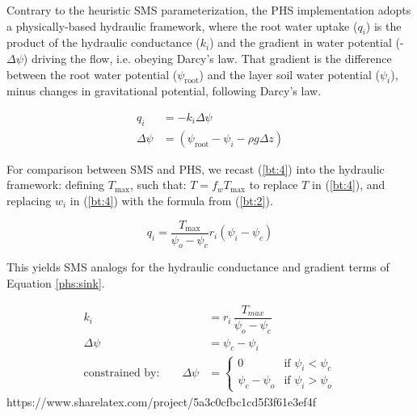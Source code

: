\documentclass[draft,linenumbers]{agujournal}
\begin{document}
    Contrary to the heuristic SMS parameterization, the PHS implementation adopts a physically-based hydraulic framework, where the root water uptake ($q_i$) is the product of the hydraulic conductance ($k_i$) and the gradient in water potential (-$\Delta\psi$) driving the flow, i.e. obeying Darcy's law. That gradient is the difference between the root water potential ($\psi_{\text{root}}$) and the layer soil water potential ($\psi_i$), minus changes in gravitational potential, following Darcy's law.
    
    \begin{linenomath*}
    \begin{equation}
        \begin{aligned}
    q_i &= -k_i \Delta\psi \\
    \Delta\psi &= \left(\psi_{\text{root}}-\psi_{i}-\rho g \Delta z\right)
    \label{phs:sink}
    \end{aligned}
    \end{equation}
    \end{linenomath*}
    
    For comparison between SMS and PHS, we recast (\ref{bt:4}) into the hydraulic framework: defining $T_{\text{max}}$, such that: $T = f_w T_{\text{max}}$ to replace $T$ in (\ref{bt:4}), and replacing $w_i$ in (\ref{bt:4}) with the formula from (\ref{bt:2}).
    
    \begin{linenomath*}
    \begin{equation}
    \label{eq:btrwu}
    q_i = \dfrac{T_{\text{max}}}{\psi_{o}-\psi_{c}} r_i \left(\psi_i-\psi_{c} \right)
    \end{equation}
    \end{linenomath*}
    
    This yields SMS analogs for the hydraulic conductance and gradient terms of Equation \ref{phs:sink}.
    \begin{linenomath*}
    \begin{equation} \begin{aligned}
    k_i &= r_i \, \dfrac{T_{max}}{\psi_{o}-\psi_{c}} \\
    \Delta\psi &=  \psi_{c}-\psi_i \\
    \mbox{constrained by:} \qquad
    \Delta\psi &=
    \begin{cases}
    0                          & \text{if } \psi_i<\psi_{c}  \\
    \psi_{c}-\psi_{o} & \text{if } \psi_i>\psi_{o}
    \label{kb}
    \end{cases}
    \end{aligned}\end{equation}https://www.sharelatex.com/project/5a3c0cfbc1cd5f3f61e3ef4f
    \end{linenomath*}
\end{document}
